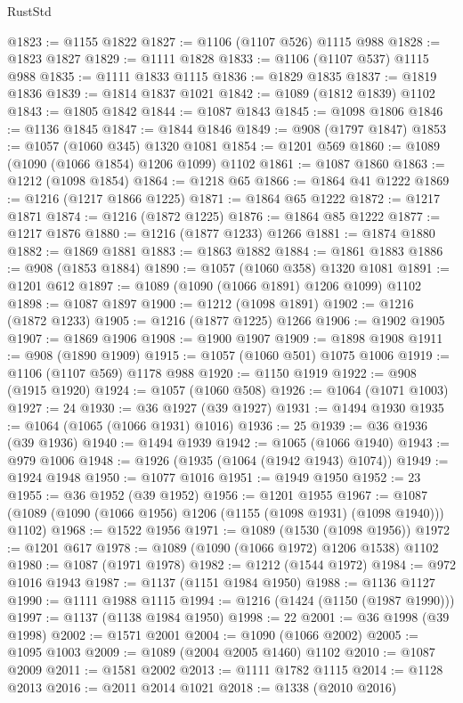 \begin{lexlean}{RustStd}
\begin{coremodule}
{\begin{coremodule}
{{{{{{{{{{{{{{{{{{{{{{{{{{@1823 := @1155 @1822
@1827 := @1106 (@1107 @526) @1115 @988
@1828 := @1823 @1827
@1829 := @1111 @1828
@1833 := @1106 (@1107 @537) @1115 @988
@1835 := @1111 @1833 @1115
@1836 := @1829 @1835
@1837 := @1819 @1836
@1839 := @1814 @1837 @1021
@1842 := @1089 (@1812 @1839) @1102
@1843 := @1805 @1842
@1844 := @1087 @1843
@1845 := @1098 @1806
@1846 := @1136 @1845
@1847 := @1844 @1846
@1849 := @908 (@1797 @1847)
@1853 := @1057 (@1060 @345) @1320 @1081
@1854 := @1201 @569
@1860 := @1089 (@1090 (@1066 @1854) @1206 @1099) @1102
@1861 := @1087 @1860
@1863 := @1212 (@1098 @1854)
@1864 := @1218 @65
@1866 := @1864 @41 @1222
@1869 := @1216 (@1217 @1866 @1225)
@1871 := @1864 @65 @1222
@1872 := @1217 @1871
@1874 := @1216 (@1872 @1225)
@1876 := @1864 @85 @1222
@1877 := @1217 @1876
@1880 := @1216 (@1877 @1233) @1266
@1881 := @1874 @1880
@1882 := @1869 @1881
@1883 := @1863 @1882
@1884 := @1861 @1883
@1886 := @908 (@1853 @1884)
@1890 := @1057 (@1060 @358) @1320 @1081
@1891 := @1201 @612
@1897 := @1089 (@1090 (@1066 @1891) @1206 @1099) @1102
@1898 := @1087 @1897
@1900 := @1212 (@1098 @1891)
@1902 := @1216 (@1872 @1233)
@1905 := @1216 (@1877 @1225) @1266
@1906 := @1902 @1905
@1907 := @1869 @1906
@1908 := @1900 @1907
@1909 := @1898 @1908
@1911 := @908 (@1890 @1909)
@1915 := @1057 (@1060 @501) @1075 @1006
@1919 := @1106 (@1107 @569) @1178 @988
@1920 := @1150 @1919
@1922 := @908 (@1915 @1920)
@1924 := @1057 (@1060 @508)
@1926 := @1064 (@1071 @1003)
@1927 := 24
@1930 := @36 @1927 (@39 @1927)
@1931 := @1494 @1930
@1935 := @1064 (@1065 (@1066 @1931) @1016)
@1936 := 25
@1939 := @36 @1936 (@39 @1936)
@1940 := @1494 @1939
@1942 := @1065 (@1066 @1940)
@1943 := @979 @1006
@1948 := @1926 (@1935 (@1064 (@1942 @1943) @1074))
@1949 := @1924 @1948
@1950 := @1077 @1016
@1951 := @1949 @1950
@1952 := 23
@1955 := @36 @1952 (@39 @1952)
@1956 := @1201 @1955
@1967 := @1087 (@1089 (@1090 (@1066 @1956) @1206 (@1155 (@1098 @1931) (@1098 @1940))) @1102)
@1968 := @1522 @1956
@1971 := @1089 (@1530 (@1098 @1956))
@1972 := @1201 @617
@1978 := @1089 (@1090 (@1066 @1972) @1206 @1538) @1102
@1980 := @1087 (@1971 @1978)
@1982 := @1212 (@1544 @1972)
@1984 := @972 @1016 @1943
@1987 := @1137 (@1151 @1984 @1950)
@1988 := @1136 @1127
@1990 := @1111 @1988 @1115
@1994 := @1216 (@1424 (@1150 (@1987 @1990)))
@1997 := @1137 (@1138 @1984 @1950)
@1998 := 22
@2001 := @36 @1998 (@39 @1998)
@2002 := @1571 @2001
@2004 := @1090 (@1066 @2002)
@2005 := @1095 @1003
@2009 := @1089 (@2004 @2005 @1460) @1102
@2010 := @1087 @2009
@2011 := @1581 @2002
@2013 := @1111 @1782 @1115
@2014 := @1128 @2013
@2016 := @2011 @2014 @1021
@2018 := @1338 (@2010 @2016)
}}}}}}}}}}}}}}}}}}}}}}}}}}
\end{coremodule}}
\end{coremodule}
\end{lexlean}
